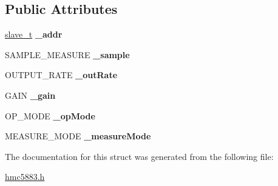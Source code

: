 \subsection*{Public Attributes}
\begin{DoxyCompactItemize}
\item 
\mbox{\label{structhmc5883__t_a78fcab12d61314413e2000223c8acc9b}} 
\hyperlink{structslave__t}{slave\+\_\+t} {\bfseries \+\_\+addr}
\item 
\mbox{\label{structhmc5883__t_a5d6bda3e7c498f9338bf60d4eb0676f1}} 
S\+A\+M\+P\+L\+E\+\_\+\+M\+E\+A\+S\+U\+RE {\bfseries \+\_\+sample}
\item 
\mbox{\label{structhmc5883__t_abdd992bb7c065497ba272dff4bd5b5fc}} 
O\+U\+T\+P\+U\+T\+\_\+\+R\+A\+TE {\bfseries \+\_\+out\+Rate}
\item 
\mbox{\label{structhmc5883__t_adafec64b6dd1f3fab546d3af997ccd0e}} 
G\+A\+IN {\bfseries \+\_\+gain}
\item 
\mbox{\label{structhmc5883__t_ae5ae94558f6f65fc5bfda7c3cd23c0da}} 
O\+P\+\_\+\+M\+O\+DE {\bfseries \+\_\+op\+Mode}
\item 
\mbox{\label{structhmc5883__t_ab81da8b66db5c81e2d5104b018cca68d}} 
M\+E\+A\+S\+U\+R\+E\+\_\+\+M\+O\+DE {\bfseries \+\_\+measure\+Mode}
\end{DoxyCompactItemize}


The documentation for this struct was generated from the following file\+:\begin{DoxyCompactItemize}
\item 
\hyperlink{hmc5883_8h}{hmc5883.\+h}\end{DoxyCompactItemize}
